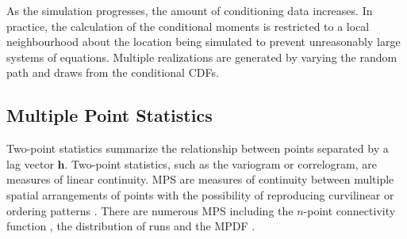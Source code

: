 As the simulation progresses, the amount of conditioning data increases. In practice, the calculation of the conditional moments is restricted to a local neighbourhood about the location being simulated to prevent unreasonably large systems of equations. Multiple realizations are generated by varying the random path and draws from the conditional \glspl{CDF}.






\FloatBarrier
\subsection{Multiple Point Statistics}
\label{subsec:01mps}

Two-point statistics summarize the relationship between points separated by a lag vector $\mathbf{h}$. Two-point statistics, such as the variogram or correlogram, are measures of linear continuity. \Gls{MPS} are measures of continuity between multiple spatial arrangements of points with the possibility of reproducing curvilinear or ordering patterns \citep{boisvert2007multiplepoint}. There are numerous \gls{MPS} including the $n$-point connectivity function \citep{journel1989nongaussian}, the distribution of runs \citep{ortiz2003characterization} and the \gls{MPDF} \citep{boisvert2007multiplepoint}.

